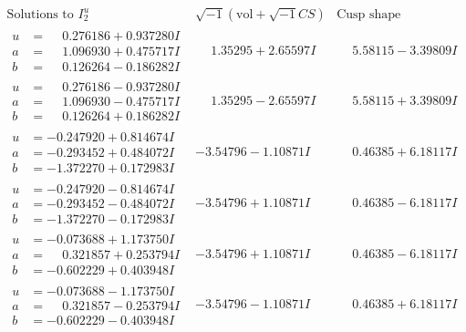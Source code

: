 \documentclass[1p]{elsarticle_modified}
\theoremstyle{definition}
\newcommand{\I}{\sqrt{-1}}
\begin{document}
$$\begin{array}{c|c|c}  
\text{Solutions to }I^u_{2}& \I (\text{vol} + \sqrt{-1}CS) & \text{Cusp shape}\\
 \hline 
\begin{aligned}
u &= \phantom{-}0.276186 + 0.937280 I \\
a &= \phantom{-}1.096930 + 0.475717 I \\
b &= \phantom{-}0.126264 - 0.186282 I\end{aligned}
 & \phantom{-}1.35295 + 2.65597 I & \phantom{-}5.58115 - 3.39809 I \\ \hline\begin{aligned}
u &= \phantom{-}0.276186 - 0.937280 I \\
a &= \phantom{-}1.096930 - 0.475717 I \\
b &= \phantom{-}0.126264 + 0.186282 I\end{aligned}
 & \phantom{-}1.35295 - 2.65597 I & \phantom{-}5.58115 + 3.39809 I \\ \hline\begin{aligned}
u &= -0.247920 + 0.814674 I \\
a &= -0.293452 + 0.484072 I \\
b &= -1.372270 + 0.172983 I\end{aligned}
 & -3.54796 - 1.10871 I & \phantom{-}0.46385 + 6.18117 I \\ \hline\begin{aligned}
u &= -0.247920 - 0.814674 I \\
a &= -0.293452 - 0.484072 I \\
b &= -1.372270 - 0.172983 I\end{aligned}
 & -3.54796 + 1.10871 I & \phantom{-}0.46385 - 6.18117 I \\ \hline\begin{aligned}
u &= -0.073688 + 1.173750 I \\
a &= \phantom{-}0.321857 + 0.253794 I \\
b &= -0.602229 + 0.403948 I\end{aligned}
 & -3.54796 + 1.10871 I & \phantom{-}0.46385 - 6.18117 I \\ \hline\begin{aligned}
u &= -0.073688 - 1.173750 I \\
a &= \phantom{-}0.321857 - 0.253794 I \\
b &= -0.602229 - 0.403948 I\end{aligned}
 & -3.54796 - 1.10871 I & \phantom{-}0.46385 + 6.18117 I \\ \hline\begin{aligned}

\end{aligned}
\end{array}$$
\end{document}
